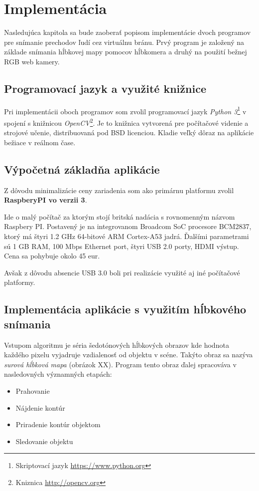 \chapter{Implementácia}

Nasledujúca kapitola sa bude zaoberať popisom implementácie dvoch programov pre snímanie prechodov ľudí cez virtuálnu bránu. Prvý program je založený na základe snímania hĺbkovej mapy pomocov hĺbkomera a druhý  na použití bežnej RGB web kamery.

\section{Programovací jazyk a využité knižnice}
Pri implementácii oboch programov som zvolil programovací jazyk \textit{Python 3}\footnote{Skriptovací jazyk \url{https://www.python.org}} v spojení s knižnicou \textit{OpenCV}\footnote{Kniznica \url{http://opencv.org}}. Je to knižnica vytvorená pre počítačové videnie a strojové učenie, distribuovaná pod BSD licenciou. Kladie veľký dôraz na aplikácie bežiace v reálnom čase. 

\section{Výpočetná základňa aplikácie}
Z dôvodu minimalizácie ceny zariadenia som ako primárnu platformu zvolil \textbf{RaspberyPI vo verzii 3}. 

Ide o malý počítač za ktorým stojí britská nadácia s rovnomenným názvom Raspbery PI. Postavený je na  integrovanom Broadcom SoC procesore BCM2837, ktorý má štyri 1.2 GHz 64-bitové ARM Cortex-A53 jadrá. Ďalšími parametrami sú 1 GB RAM, 100 Mbps Ethernet port, štyri USB 2.0 porty, HDMI výstup. Cena sa pohybuje okolo 45 eur. 

Avšak z dôvodu absencie USB 3.0 boli pri realizácie využité aj iné počítačové platformy.

\section{Implementácia aplikácie s využitím hĺbkového snímania}
Vstupom algoritmu je séria šedotónových hĺbkových obrazov kde hodnota každého pixelu vyjadruje vzdialenosť od objektu v scéne. Takýto obraz sa nazýva \textit{surová hĺbková mapa} (obrázok XX). Program tento obraz ďalej spracováva v nasledovných významných etapách: 

\begin{itemize}
\item Prahovanie
\item Nájdenie kontúr
\item Priradenie kontúr objektom
\item Sledovanie objektu 
\end{itemize}




